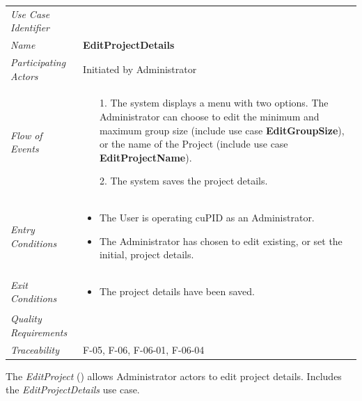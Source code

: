 \documentclass[12pt,letterpaper]{article}
\begin{document}
\begin{center}
	\begin{tabu} to 
		\toprule
		Use Case Identifier & \editprojectdetails{} \\
		Name & {\bf EditProjectDetails} \\
		Participating Actors & Initiated by Administrator \\
		Flow of Events & 
		\begin{minipage}[t]{\linewidth}
		    \begin{enumerate}
			    \item[1.] The system displays a menu with two options. The Administrator can choose to edit the minimum and maximum group size (include use case \textbf{EditGroupSize}), or the name of the Project (include use case \textbf{EditProjectName}).
			    \item[2.] The system saves the project details.
			\end{enumerate}
		\end{minipage} \\

		Entry Conditions &
		\begin{minipage}[t]{\linewidth}
			\begin{itemize}
			    \item The User is operating cuPID as an Administrator.
			    \item The Administrator has chosen to edit existing, or set the initial, project details.
	        \end{itemize}
		\end{minipage} \\

		Exit Conditions &
		\begin{minipage}[t]{\linewidth}
			\begin{itemize}
			    \item The project details have been saved.
	        \end{itemize}
		\end{minipage} \\


		Quality Requirements & \\

		Traceability & F-05, F-06, F-06-01, F-06-04 \\
		\toprule
	\end{tabu}
\end{center}

\vspace{1em}
The {\it EditProject} ({\bf \editproject{}}) allows Administrator actors to edit project details. Includes the {\it EditProjectDetails} use case.
\end{document}
